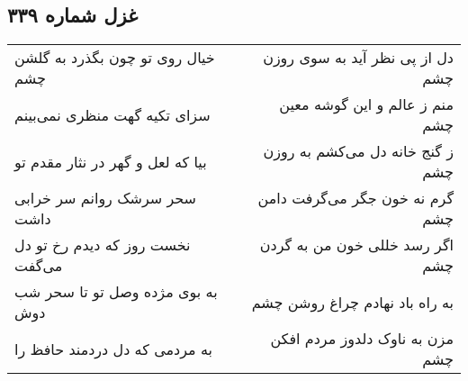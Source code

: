 \begin{center}
\section*{غزل شماره ۳۳۹}
\label{sec:sh339}
\begin{longtable}{l p{0.5cm} r}
خیال روی تو چون بگذرد به گلشن چشم
&&
دل از پی نظر آید به سوی روزن چشم
\\
سزای تکیه گهت منظری نمی‌بینم
&&
منم ز عالم و این گوشه معین چشم
\\
بیا که لعل و گهر در نثار مقدم تو
&&
ز گنج خانه دل می‌کشم به روزن چشم
\\
سحر سرشک روانم سر خرابی داشت
&&
گرم نه خون جگر می‌گرفت دامن چشم
\\
نخست روز که دیدم رخ تو دل می‌گفت
&&
اگر رسد خللی خون من به گردن چشم
\\
به بوی مژده وصل تو تا سحر شب دوش
&&
به راه باد نهادم چراغ روشن چشم
\\
به مردمی که دل دردمند حافظ را
&&
مزن به ناوک دلدوز مردم افکن چشم
\\
\end{longtable}
\end{center}
